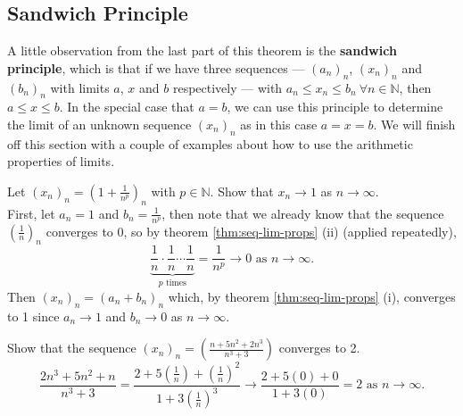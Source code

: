 \documentclass[../real_analysis.tex]{subfiles}
\begin{document}
        \subsection{Sandwich Principle}\label{subsec:sandwich-principle}
            A little observation from the last part of this theorem is the \textbf{sandwich principle}, which is that if we have three sequences --- $(a_n)_n$, $(x_n)_n$ and $(b_n)_n$ with limits $a$, $x$ and $b$ respectively --- with $a_n\leq x_n\leq b_n\ \forall n\in\mathbb{N}$, then $a\leq x\leq b$. In the special case that $a=b$, we can use this principle to determine the limit of an unknown sequence $(x_n)_n$ as in this case $a=x=b$. We will finish off this section with a couple of examples about how to use the arithmetic properties of limits.
            \begin{example}
                Let $(x_n)_n=\left(1+\frac{1}{n^p}\right)_n$ with $p\in\mathbb{N}$. Show that $x_n\to1$ as $n\to\infty$.\\
                First, let $a_n=1$ and $b_n=\frac{1}{n^p}$, then note that we already know that the sequence $\left(\frac{1}{n}\right)_n$ converges to 0, so by theorem \ref{thm:seq-lim-props} (ii) (applied repeatedly),
                \begin{equation}
                    \underbrace{\frac{1}{n}\cdot\frac{1}{n}\cdots\frac{1}{n}}_{p\text{ times}}=\frac{1}{n^p}\to0\text{ as }n\to\infty.
                \end{equation}
                Then $(x_n)_n=(a_n+b_n)_n$ which, by theorem \ref{thm:seq-lim-props} (i), converges to 1 since $a_n\to1$ and $b_n\to0$ as $n\to\infty$.
            \end{example}
            \begin{example}
                Show that the sequence $(x_n)_n=\left(\frac{n+5n^2+2n^3}{n^3+3}\right)$ converges to 2.\\
                \begin{equation}
                    \frac{2n^3+5n^2+n}{n^3+3}=\frac{2+5\left(\frac{1}{n}\right)+\left(\frac{1}{n}\right)^2}{1+3\left(\frac{1}{n}\right)^3}\to\frac{2+5(0)+0}{1+3(0)}=2\text{ as }n\to\infty.
                \end{equation}
            \end{example}
\end{document}
